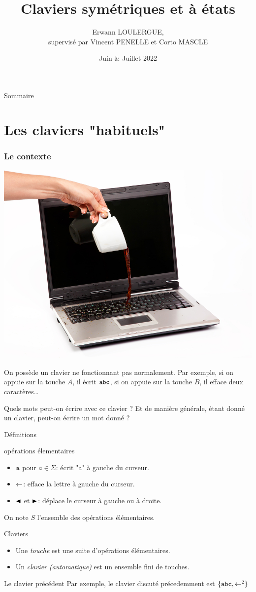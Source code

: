 \documentclass[11pt,french]{beamer}
\title{Claviers symétriques et à états}
\author[Erwann LOULERGUE]{Erwann LOULERGUE, \texorpdfstring{\\supervisé par Vincent PENELLE et Corto MASCLE}{}}
\date{Juin \& Juillet 2022}
\institute[ENS Paris-Saclay]{Au LaBRI}
\begin{document}
\begin{frame}
	\titlepage
\end{frame}

\begin{frame}{Sommaire}
	\tableofcontents
\end{frame}

\section{Les claviers "habituels"}
\begin{frame}
	\frametitle{Le contexte}
	\begin{center}
		\includegraphics[height=0.3\textwidth]{Drame.jpg}	
	\end{center}

	On possède un clavier ne fonctionnant pas normalement. Par exemple, si on appuie sur la touche $A$, il écrit $\mathtt{abc}$, si on appuie sur la touche $B$, il efface deux caractères\dots

	Quels mots peut-on écrire avec ce clavier ? Et de manière générale, étant donné un clavier, peut-on écrire un mot donné ?

\end{frame}
\begin{frame}{Définitions}
	\begin{block}{opérations élementaires}
		\begin{itemize}
			\item $\mathtt{a}$ pour $a \in \Sigma$: écrit "a" à gauche du curseur. \pause
			\item $\mathord{\leftarrow}$: efface la lettre à gauche du curseur. \pause
			\item $\mathord{\blacktriangleleft}$ et $\mathord{\blacktriangleright}$: déplace le curseur à gauche ou à droite.
		\end{itemize}
	\end{block}
	\vspace{-8pt}
	On note $S$ l'ensemble des opérations élémentaires.
	\pause
	\begin{block}{Claviers}
		\begin{itemize}
			\item Une \emph{touche} est une suite d'opérations élémentaires. \pause
			\item Un \emph{clavier (automatique)} est un ensemble fini de touches.
		\end{itemize}
	\end{block}
	\begin{exampleblock}{Le clavier précédent}
		Par exemple, le clavier discuté précedemment est $\{\mathtt{abc},\mathord{\leftarrow}^2\}$
	\end{exampleblock}
\end{frame}
\end{document}
